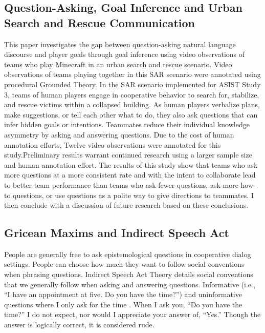 \subsection{Question-Asking, Goal Inference and Urban Search and Rescue Communication}
This paper investigates the gap between question-asking natural language discourse and player goals through goal inference using video observations of teams who play Minecraft in an urban search and rescue scenario. Video observations of teams playing together in this SAR scenario were annotated using procedural Grounded Theory. In the SAR scenario implemented for ASIST Study 3, teams of human players
engage in cooperative behavior to search for, stabilize, and rescue victims
within a collapsed building. As human players verbalize plans, make
suggestions, or tell each other what to do, they also ask questions that can
infer hidden goals or intentions. Teammates reduce their individual knowledge
asymmetry by asking and answering questions. Due to the cost of human annotation efforts, Twelve video observations were annotated for this study.Preliminary results warrant continued research using a larger sample size and human annotation effort. The results of this study show that teams who ask more questions at a more consistent rate and with the intent to collaborate lead to better team performance than teams who ask fewer questions, ask more how-to questions, or use questions as a polite way to give directions to teammates. I then conclude with a discussion of future research based on these conclusions. 

\subsection{Gricean Maxims and Indirect Speech Act}
People are generally free to ask epistemological questions in cooperative dialog settings. People can choose how much they want to follow social conventions when phrasing questions. Indirect Speech Act Theory details social conventions that we generally follow when asking and answering questions. Informative (i.e., “I have an appointment at five. Do you have the time?”) and uninformative questions where I only ask for the time \citet{clark_1979}. When I ask you, “Do you have the time?” I do not expect, nor would I appreciate your answer of, “Yes.” Though the answer is logically correct, it is considered rude.

